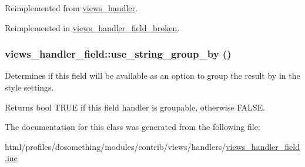 Reimplemented from \hyperlink{classviews__handler_ae81019ed08d9c3f5bca3d16c69e7b39f}{views\_\-handler}.

Reimplemented in \hyperlink{classviews__handler__field__broken_a0b3272926656e5fc3f6c011fa51746ed}{views\_\-handler\_\-field\_\-broken}.\hypertarget{classviews__handler__field_a6ad5b2f1a4b1bc71e296a9ce16f1cf08}{
\subsubsection[{use\_\-string\_\-group\_\-by}]{\setlength{\rightskip}{0pt plus 5cm}views\_\-handler\_\-field::use\_\-string\_\-group\_\-by ()}}
\label{classviews__handler__field_a6ad5b2f1a4b1bc71e296a9ce16f1cf08}
Determines if this field will be available as an option to group the result by in the style settings.

\begin{DoxyReturn}{Returns}
bool TRUE if this field handler is groupable, otherwise FALSE. 
\end{DoxyReturn}


The documentation for this class was generated from the following file:\begin{DoxyCompactItemize}
\item 
html/profiles/dosomething/modules/contrib/views/handlers/\hyperlink{views__handler__field_8inc}{views\_\-handler\_\-field.inc}\end{DoxyCompactItemize}
